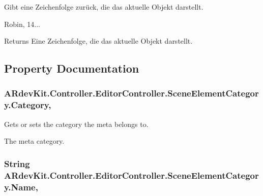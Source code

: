 Gibt eine Zeichenfolge zurück, die das aktuelle Objekt darstellt. 

Robin, 14... 

\begin{DoxyReturn}{Returns}
Eine Zeichenfolge, die das aktuelle Objekt darstellt. 
\end{DoxyReturn}


\subsection{Property Documentation}
\hypertarget{class_a_rdev_kit_1_1_controller_1_1_editor_controller_1_1_scene_element_category_a3b683fe0bda9ff970f7fbc1099818647}{
\subsubsection[{Category}]{ A\-Rdev\-Kit.\-Controller.\-Editor\-Controller.\-Scene\-Element\-Category.\-Category\hspace{0.3cm}{\ttfamily [get]}, {\ttfamily [set]}}}\label{class_a_rdev_kit_1_1_controller_1_1_editor_controller_1_1_scene_element_category_a3b683fe0bda9ff970f7fbc1099818647}


Gets or sets the category the meta belongs to. 

The meta category. \hypertarget{class_a_rdev_kit_1_1_controller_1_1_editor_controller_1_1_scene_element_category_a0f33148739c409a2fe2210c4e3ece165}{
\subsubsection[{Name}]{\setlength{\rightskip}{0pt plus 5cm}String A\-Rdev\-Kit.\-Controller.\-Editor\-Controller.\-Scene\-Element\-Category.\-Name\hspace{0.3cm}{\ttfamily [get]}, {\ttfamily [set]}}}\label{class_a_rdev_kit_1_1_controller_1_1_editor_controller_1_1_scene_element_category_a0f33148739c409a2fe2210c4e3ece165}


